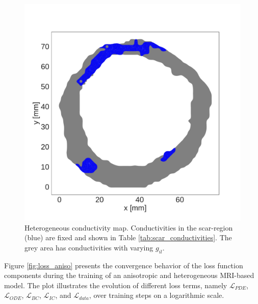 \begin{multicols}{2}
\begin{figure}[H]
    \centering
    \includegraphics[width=0.8\linewidth]{Figs/Anisotropic/scar_region.pdf}
    \caption{Heterogeneous conductivity map. Conductivities in the scar-region (blue) are fixed and shown in Table \ref{tab:scar_conductivities}. The grey area has conductivities with varying $g_{il}$.}
    \label{fig:scar}
\end{figure}




\end{multicols}
\newpage

Figure \ref{fig:loss_aniso} presents the convergence behavior of the loss function components during the training of an anisotropic and heterogeneous MRI-based model. The plot illustrates the evolution of different loss terms, namely $\mathcal{L}_{PDE}$, $\mathcal{L}_{ODE}$, $\mathcal{L}_{BC}$, $\mathcal{L}_{IC}$, and $\mathcal{L}_{data}$, over training steps on a logarithmic scale. 

